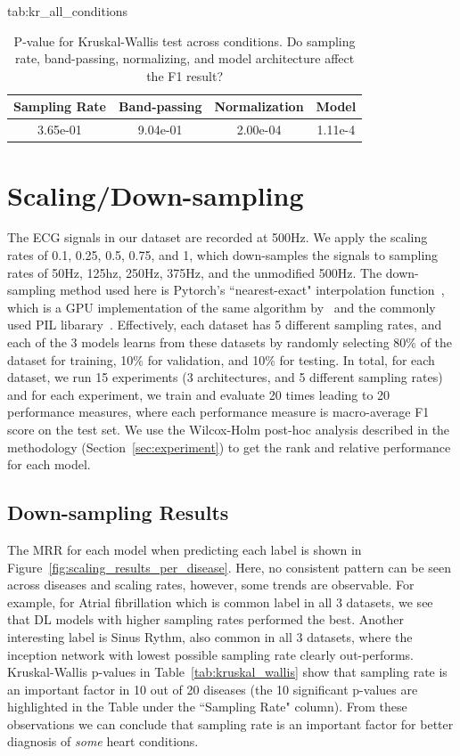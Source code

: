 \documentclass[pmlr,twocolumn]{jmlr}%
\begin{document}
\begin{table}[!h]
\floatconts
  {tab:kr_all_conditions}
  {\caption{P-value for Kruskal-Wallis test across conditions. Do sampling rate, band-passing, normalizing, and model architecture affect the F1 result?}}
  {\begin{tabular}{|c|c|c|c|}
  \hline
    \bfseries Sampling Rate & \bfseries Band-passing & \bfseries Normalization & \bfseries Model \\
  \hline
  3.65e-01 & 9.04e-01 & 2.00e-04 & 1.11e-4  \\
  \hline
  \end{tabular}}
\end{table}



\section{Scaling/Down-sampling}
\label{sec:scaling}
The ECG signals in our dataset are recorded at 500Hz. We apply the  scaling rates of 0.1, 0.25, 0.5, 0.75, and 1, which down-samples the signals to sampling rates of 50Hz, 125hz, 250Hz, 375Hz, and the unmodified 500Hz. The down-sampling method used here is Pytorch's ``nearest-exact" interpolation function~\citep{NEURIPS2019_9015}, which is a GPU implementation of the same algorithm by~\citet{van2014scikit} and the commonly used PIL libarary~\citep{clark2015pillow}. Effectively, each dataset has 5 different sampling rates, and each of the 3 models learns from these datasets by randomly selecting 80\% of the dataset for training, 10\% for validation, and 10\% for testing. In total, for each dataset, we run 15 experiments (3 architectures, and 5 different sampling rates) and for each experiment, we train and evaluate 20 times leading to 20 performance measures, where each performance measure is macro-average F1 score on the test set. We use the Wilcox-Holm post-hoc analysis described in the methodology (Section~\ref{sec:experiment}) to get the rank and relative performance for each model. 
\subsection{Down-sampling Results}
\label{sec_ds_results}
The MRR for each model when predicting each label is shown in Figure~\ref{fig:scaling_results_per_disease}. Here, no consistent pattern can be seen across diseases and scaling rates, however, some trends are observable. For example, for Atrial fibrillation which is common label in all 3 datasets, we see that DL models with higher sampling rates performed the best. Another interesting label is Sinus Rythm, also common in all 3 datasets,  where the inception network with lowest possible sampling rate clearly out-performs. Kruskal-Wallis p-values in Table~\ref{tab:kruskal_wallis} show that sampling rate is an important factor in 10 out of 20 diseases (the 10 significant p-values are highlighted in the Table under the ``Sampling Rate" column). From these observations we can conclude that sampling rate is an important factor for better diagnosis of \textit{some} heart conditions. 
\end{document}
